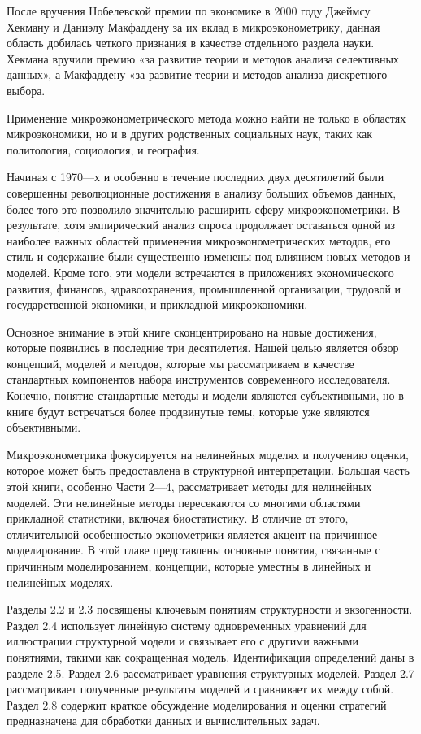 		
	После вручения Нобелевской премии по экономике в 2000 году Джеймсу Хекману и Даниэлу Макфаддену за их вклад в микроэконометрику, данная область добилась четкого признания в качестве отдельного раздела науки. Хекмана вручили премию «за развитие теории и методов анализа селективных данных», а Макфаддену «за развитие теории и методов анализа дискретного выбора. 
	
		
	Применение микроэконометрического метода можно найти не только в областях микроэкономики, но и в других родственных социальных наук, таких как политология, социология, и география. 
	
	
	Начиная с 1970---х и особенно в течение последних двух десятилетий были совершенны революционные достижения в анализу больших объемов данных, более того это позволило значительно расширить сферу микроэконометрики. В результате, хотя эмпирический анализ спроса продолжает оставаться одной из наиболее важных областей применения микроэконометрических методов, его стиль и содержание были существенно изменены под влиянием новых методов и моделей. Кроме того, эти модели встречаются в приложениях экономического развития, финансов, здравоохранения, промышленной организации, трудовой и государственной экономики, и прикладной микроэкономики. 
	
	
	Основное внимание в этой книге сконцентрировано на новые достижения, которые появились в последние три десятилетия. Нашей целью является обзор концепций, моделей и методов, которые мы рассматриваем в качестве стандартных компонентов набора инструментов современного исследователя. Конечно, понятие стандартные методы и модели являются субъективными, но в книге будут встречаться более продвинутые темы, которые уже являются объективными. 
	
		
	Микроэконометрика фокусируется на нелинейных моделях и получению оценки, которое может быть предоставлена в структурной интерпретации. Большая часть этой книги, особенно Части 2---4, рассматривает методы для нелинейных моделей. Эти нелинейные методы пересекаются со многими областями прикладной статистики, включая биостатистику. В отличие от этого, отличительной особенностью эконометрики является акцент на причинное моделирование. В этой главе представлены основные понятия, связанные с причинным моделированием, концепции, которые уместны в линейных и нелинейных моделях. 
	
	
	Разделы 2.2 и 2.3 посвящены ключевым понятиям структурности и экзогенности. Раздел 2.4 использует линейную систему одновременных уравнений для иллюстрации структурной модели и связывает его с другими важными понятиями, такими как сокращенная модель. Идентификация определений даны в разделе 2.5. Раздел 2.6 рассматривает уравнения структурных моделей. Раздел 2.7 рассматривает полученные результаты моделей и сравнивает их между собой. Раздел 2.8 содержит краткое обсуждение моделирования и оценки стратегий предназначена для обработки данных и вычислительных задач.
	
